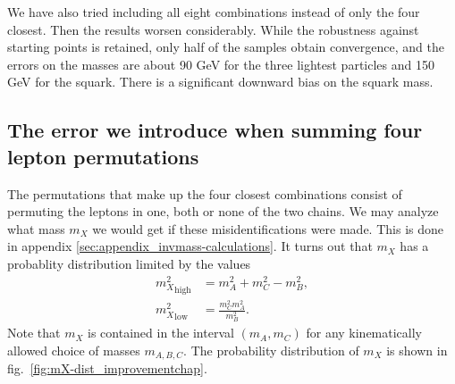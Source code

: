 \documentclass[twoside,english]{uiofysmaster}
\begin{document}
We have also tried including all eight combinations instead of only the four closest. Then the results worsen considerably. While the robustness against starting points is retained, only half of the samples obtain convergence, and the errors on the masses are about 90 GeV for the three lightest particles and 150 GeV for the squark. There is a significant downward bias on the squark mass.

\subsection{The error we introduce when summing four lepton permutations}
The permutations that make up the four closest combinations consist of permuting the leptons in one, both or none of the two chains. We may analyze what mass $m_X$ we would get if these misidentifications were made. This is done in appendix \ref{sec:appendix_invmass-calculations}. It turns out that $m_X$ has a probablity distribution limited by the values 
\begin{align}
	{m_X^2}_\mathrm{high} &= m_A^2 + m_C^2 - m_B^2,\\
	{m_X^2}_\mathrm{low} &= \frac{m_C^2 m_A^2}{m_B^2}.\nonumber
\end{align}
Note that $m_X$ is contained in the interval $(m_A, m_C)$ for any kinematically allowed choice of masses $m_{A,B,C}.$ The probability distribution of $m_X$ is shown in fig.\ \ref{fig:mX-dist_improvementchap}.
\end{document}
